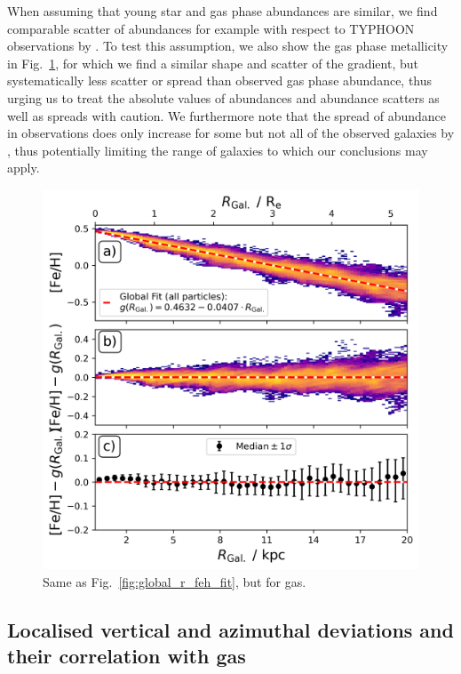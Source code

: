 \documentclass[fleqn,usenatbib]{mnras}
\begin{document}
When assuming that young star and gas phase abundances are similar, we find comparable scatter of abundances for example with respect to TYPHOON observations by \citet{Chen2023}. To test this assumption, we also show the gas phase metallicity in Fig.~\ref{fig:global_r_feh_fit_gas}, for which we find a similar shape and scatter of the gradient, but systematically less scatter or spread than observed gas phase abundance, thus urging us to treat the absolute values of abundances and abundance scatters as well as spreads with caution. We furthermore note that the spread of abundance in observations does only increase for some but not all of the observed galaxies by \citet{Chen2023}, thus potentially limiting the range of galaxies to which our conclusions may apply.

\begin{figure}
    \centering
    \includegraphics[width=\columnwidth]{figures/global_r_feh_fit_gas.png}
    \caption{Same as Fig.~\ref{fig:global_r_feh_fit}, but for gas.}
    \label{fig:global_r_feh_fit_gas}
\end{figure}

\subsection{Localised vertical and azimuthal deviations and their correlation with gas} \label{sec:discussion_coherence_position}
\end{document}
